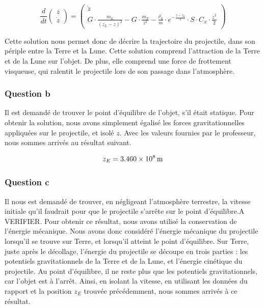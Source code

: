 \documentclass[a4paper,12pt,twoside]{article}
\begin{document}
\begin{equation}
    \frac{d}{dt}
    \begin{pmatrix}
        z \\
        \dot{z}
    \end{pmatrix}
    =
    \begin{pmatrix}
    \dot{z} \\
    G\cdot\frac{m_L}{(z_L - z)^2} - G\cdot\frac{m_T}{z^2} - \frac{\rho_0}{m}\cdot e^{-\frac{z-z_0}{\lambda}}\cdot S\cdot C_x\cdot \frac{\dot{z}^2}{2}
    \end{pmatrix}
    \label{eq:sol}
\end{equation}

Cette solution nous permet donc de décrire la trajectoire du projectile, dans son périple entre la Terre et la Lune.
Cette solution comprend l'attraction de la Terre et de la Lune sur l'objet.
De plus, elle comprend une force de frottement visqueuse, qui ralentit le projectile lors de son passage dans l'atmosphère.\\

\subsubsection*{Question b}
Il est demandé de trouver le point d'équilibre de l'objet, s'il était statique.
Pour obtenir la solution, nous avons simplement égalisé les forces gravitationnelles appliquées sur le projectile, et isolé $z$.
Avec les valeurs fournies par le professeur, nous sommes arrivés au résultat suivant.

\begin{equation}
    z_E = \SI{3.460d8}{\meter}
    \label{val:zE}
\end{equation}

\subsubsection*{Question c}
Il nous est demandé de trouver, en négligeant l'atmosphère terrestre, la vitesse initiale qu'il faudrait pour que le projectile s'arrête sur le point d'équilibre.A VERIFIER.
Pour obtenir ce résultat, nous avons utilisé la conservation de l'énergie mécanique.
Nous avons donc considéré l'énergie mécanique du projectile lorsqu'il se trouve sur Terre, et lorsqu'il atteint le point d'équilibre.
Sur Terre, juste après le décollage, l'énergie du projectile se découpe en trois parties :
les potentiels gravitationnels de la Terre et de la Lune, et l'énergie cinétique du projectile.
Au point d'équilibre, il ne reste plus que les potentiels gravitationnels, car l'objet est à l'arrêt.
Ainsi, en isolant la vitesse, en utilisant les données du rapport et la position $z_E$ trouvée précédemment, nous sommes arrivés à ce résultat.
\end{document}
